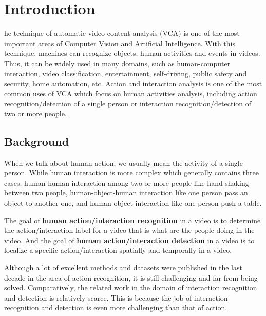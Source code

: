 %
%
\let\textcircled=\pgftextcircled
\chapter{Introduction}
\label{chap:intro}

he technique of automatic video content analysis (VCA) is one of the most important areas of Computer Vision and Artificial Intelligence. With this technique, machines can recognize objects, human activities and events in videos.   Thus, it can be widely used in many domains, such as human-computer interaction, video classification, entertainment, self-driving, public safety and security, home automation, etc. Action and interaction analysis is one of the most common uses of VCA which focus on human activities analysis, including action recognition/detection of a single person or interaction recognition/detection of two or more people.


\section{Background}
\label{sec:intro_sec01}
When we talk about human action, we usually mean the activity of a single person. While human interaction is more complex which generally contains three cases: human-human interaction among two or more people like hand-shaking between two people, human-object-human interaction like one person pass an object to another one, and human-object interaction like one person push a table. 
\par 
The goal of \textbf{human action/interaction recognition} in a video is to determine the action/interaction label for a video that is what are the people doing in the video. And the goal of \textbf{human action/interaction detection} in a video is to localize a specific action/interaction spatially and temporally in a video. 
\par 
Although a lot of excellent methods and datasets were published in the last decade in the area of action recognition, it is still challenging and far from being solved. Comparatively, the related work in the domain of interaction recognition and detection is relatively scarce. This is because the job of interaction recognition and detection is even more challenging than that of action.  
 
